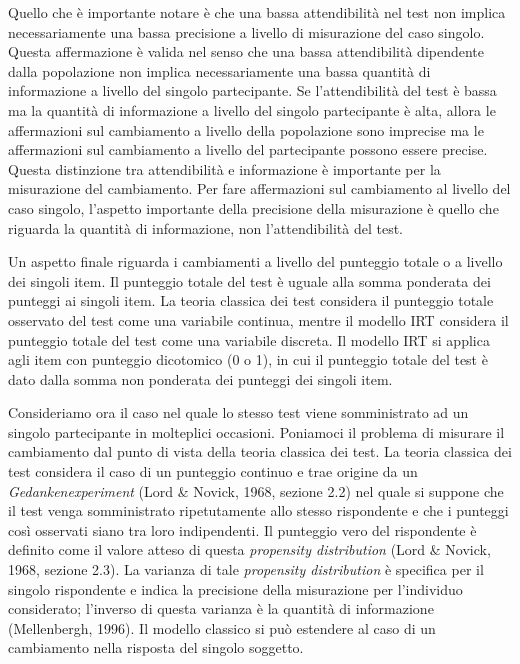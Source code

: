 Quello che è importante notare è che una bassa attendibilità nel test non implica necessariamente una bassa precisione a livello di misurazione del caso singolo.
Questa affermazione è valida nel senso che una bassa attendibilità dipendente dalla popolazione non implica necessariamente una bassa quantità di informazione a livello del singolo partecipante. 
Se l'attendibilità del test è bassa ma la quantità di informazione a livello del singolo partecipante è alta, allora le affermazioni sul cambiamento a livello della popolazione sono imprecise ma le affermazioni sul cambiamento a livello del partecipante possono essere precise. 
Questa distinzione tra attendibilità e informazione è importante per la misurazione del cambiamento. 
Per fare affermazioni sul cambiamento al livello del caso singolo, l'aspetto importante della precisione della misurazione è quello che riguarda la quantità di informazione, non l'attendibilità del test.

Un aspetto finale riguarda i cambiamenti a livello del punteggio totale o a livello dei singoli item.
Il punteggio totale del test è uguale alla somma ponderata dei punteggi ai singoli item.
La teoria classica dei test considera il punteggio totale osservato del test come una variabile continua, mentre il modello IRT considera il punteggio totale del test come una variabile discreta. 
Il modello IRT si applica agli item con punteggio dicotomico (0 o 1), in cui il punteggio totale del test è dato dalla somma non ponderata dei punteggi dei singoli item.

Consideriamo ora il caso nel quale lo stesso test viene somministrato ad un singolo partecipante in molteplici occasioni.
Poniamoci il problema di misurare il cambiamento dal punto di vista della teoria classica dei test.
La teoria classica dei test considera il caso di un punteggio continuo e trae origine da un  \emph{Gedankenexperiment} (Lord \& Novick, 1968, sezione 2.2) nel quale si suppone che il test venga somministrato ripetutamente allo stesso rispondente e che i punteggi così osservati siano tra loro indipendenti. 
Il  punteggio vero del rispondente è definito come il valore atteso di questa \emph{propensity distribution} (Lord \& Novick, 1968, sezione 2.3). 
La varianza di tale \emph{propensity distribution} è specifica per il singolo rispondente e indica la precisione della misurazione per l'individuo considerato; l'inverso di questa varianza è la quantità di informazione (Mellenbergh, 1996).
Il modello classico si può estendere al caso di un cambiamento nella risposta del singolo soggetto. 

